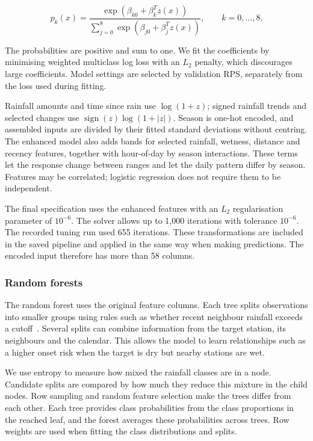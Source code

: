 \documentclass[11pt,a4paper]{article}
\begin{document}
\[
p_k(x)=\frac{\exp(\beta_{k0}+\beta_k^{T}z(x))}{\sum_{j=0}^{8}\exp(\beta_{j0}+\beta_j^{T}z(x))},\qquad k=0,\ldots,8.
\]


The probabilities are positive and sum to one. We fit the coefficients by minimising weighted multiclass log loss with an \(L_2\) penalty, which discourages large coefficients. Model settings are selected by validation RPS, separately from the loss used during fitting. 


Rainfall amounts and time since rain use \(\log(1+z)\); signed rainfall trends and selected changes use \(\operatorname{sign}(z)\log(1+|z|)\). Season is one-hot encoded, and assembled inputs are divided by their fitted standard deviations without centring. The enhanced model also adds bands for selected rainfall, wetness, distance and recency features, together with hour-of-day by season interactions. These terms let the response change between ranges and let the daily pattern differ by season. Features may be correlated; logistic regression does not require them to be independent. 


The final specification uses the enhanced features with an \(L_2\) regularisation parameter of \(10^{-6}\). The solver allows up to 1,000 iterations with tolerance \(10^{-6}\). The recorded tuning run used 655 iterations. These transformations are included in the saved pipeline and applied in the same way when making predictions. The encoded input therefore has more than 58 columns.


\subsubsection*{Random forests}
{}


The random forest uses the original feature columns. Each tree splits observations into smaller groups using rules such as whether recent neighbour rainfall exceeds a cutoff~\citep{breiman2001,spark_ml}. Several splits can combine information from the target station, its neighbours and the calendar. This allows the model to learn relationships such as a higher onset risk when the target is dry but nearby stations are wet.


We use entropy to measure how mixed the rainfall classes are in a node. Candidate splits are compared by how much they reduce this mixture in the child nodes. Row sampling and random feature selection make the trees differ from each other. Each tree provides class probabilities from the class proportions in the reached leaf, and the forest averages these probabilities across trees. Row weights are used when fitting the class distributions and splits.
\end{document}
